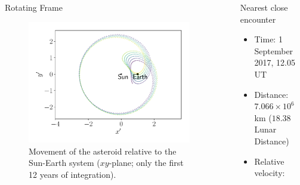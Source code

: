 \documentclass[final]{beamer}
\newlength{\sepwid}
\newlength{\onecolwid}
\newlength{\twocolwid}
\begin{document}
\begin{frame}[t]
\begin{columns}[t]
\begin{column}{\twocolwid}
\begin{columns}[t, totalwidth=\twocolwid]
\begin{column}{\onecolwid}\vspace{-.6in} 
\begin{block}{Rotating Frame}
\begin{figure}
\includegraphics[width=0.99\textwidth]{rotframe.pdf}
\caption{Movement of the asteroid relative to the Sun-Earth system ($xy$-plane; only the first 12 years of integration).}
\end{figure}
\end{block}
\end{column}

\end{columns} 

\end{column} 


\begin{column}{\sepwid}\end{column} 

\begin{column}{\onecolwid} 


\begin{alertblock}{Nearest close encounter}
\begin{itemize}
\item Time: 1 September 2017, 12.05 UT
\item Distance:  $ 7.066 \times 10^6$ km ($18.38$ Lunar Distance)
\item Relative velocity: 
\end{itemize}
\end{alertblock}



\end{column}
\end{columns}
\end{frame}
\end{document}
